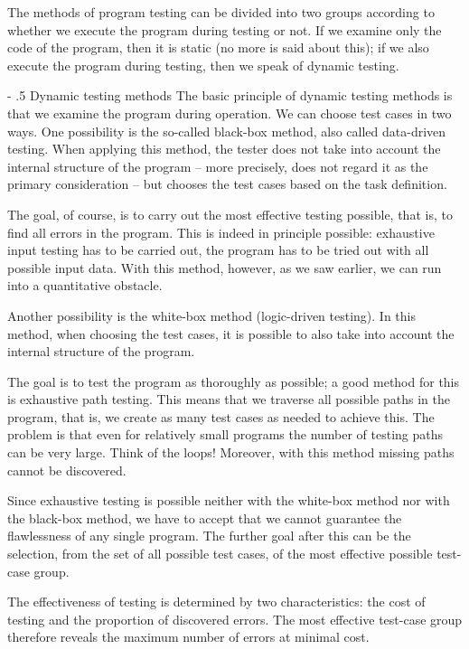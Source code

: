 \documentclass[margin=0px]{article}
\makeatletter
\renewcommand\paragraph{%
	\@startsection{paragraph}{4}{0mm}%
	{-\baselineskip}%
	{.5\baselineskip}%
	{\normalfont\normalsize\bfseries}}
\makeatother
\begin{document}
The methods of program testing can be divided into two groups according to whether we execute the program during testing or not. If we examine only the code of the program, then it is static (no more is said about this); if we also execute the program during testing, then we speak of dynamic testing.

\paragraph{Dynamic testing methods}
The basic principle of dynamic testing methods is that we examine the program during operation. We can choose test cases in two ways. One possibility is the so-called black-box method, also called data-driven testing. When applying this method, the tester does not take into account the internal structure of the program -- more precisely, does not regard it as the primary consideration -- but chooses the test cases based on the task definition.

The goal, of course, is to carry out the most effective testing possible, that is, to find all errors in the program. This is indeed in principle possible: exhaustive input testing has to be carried out, the program has to be tried out with all possible input data. With this method, however, as we saw earlier, we can run into a quantitative obstacle.

Another possibility is the white-box method (logic-driven testing). In this method, when choosing the test cases, it is possible to also take into account the internal structure of the program.

The goal is to test the program as thoroughly as possible; a good method for this is exhaustive path testing. This means that we traverse all possible paths in the program, that is, we create as many test cases as needed to achieve this. The problem is that even for relatively small programs the number of testing paths can be very large. Think of the loops! Moreover, with this method missing paths cannot be discovered.

Since exhaustive testing is possible neither with the white-box method nor with the black-box method, we have to accept that we cannot guarantee the flawlessness of any single program. The further goal after this can be the selection, from the set of all possible test cases, of the most effective possible test-case group.

The effectiveness of testing is determined by two characteristics: the cost of testing and the proportion of discovered errors. The most effective test-case group therefore reveals the maximum number of errors at minimal cost.
\end{document}

